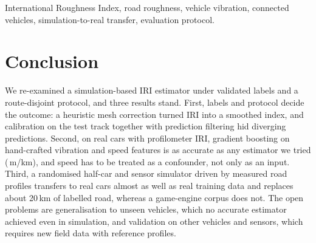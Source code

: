 \documentclass[conference]{IEEEtran}
\begin{document}
\begin{IEEEkeywords}
International Roughness Index, road roughness, vehicle vibration, connected vehicles, simulation-to-real transfer, evaluation protocol.
\end{IEEEkeywords}











\section{Conclusion}
\label{sec:conclusion}
We re-examined a simulation-based IRI estimator under validated labels and a route-disjoint protocol, and three results stand.
First, labels and protocol decide the outcome: a heuristic mesh correction turned IRI into a smoothed index, and calibration on the test track together with prediction filtering hid diverging predictions.
Second, on real cars with profilometer IRI, gradient boosting on hand-crafted vibration and speed features is as accurate as any estimator we tried (\liraGbmMae\,m/km), and speed has to be treated as a confounder, not only as an input.
Third, a randomised half-car and sensor simulator driven by measured road profiles transfers to real cars almost as well as real training data and replaces about 20\,km of labelled road, whereas a game-engine corpus does not.
The open problems are generalisation to unseen vehicles, which no accurate estimator achieved even in simulation, and validation on other vehicles and sensors, which requires new field data with reference profiles.


\end{document}
